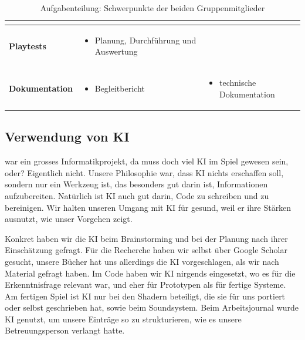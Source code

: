 \documentclass[../Main.tex]{subfiles}
\begin{document}
\begin{table}[H]
\begin{tabular}{|>{\raggedright\arraybackslash}p{2.6cm}|>{\raggedright\arraybackslash}p{5.8cm}|>{\raggedright\arraybackslash}p{5.8cm}|}
\begin{itemize}[nosep, leftmargin=*, label=--]
        \end{itemize}
        \\
        \hline
        \textbf{Playtests} &
        \begin{itemize}[nosep, leftmargin=*, label=--]
            \item Planung, Durchführung und Auswertung
        \end{itemize}
        & \\
        \hline
        \textbf{Dokumentation} &
        \begin{itemize}[nosep, leftmargin=*, label=--]
            \item Begleitbericht
        \end{itemize}
        &
        \begin{itemize}[nosep, leftmargin=*, label=--]
            \item technische Dokumentation
        \end{itemize}
        \\
        \hline
    \end{tabular}
    \caption{Aufgabenteilung: Schwerpunkte der beiden Gruppenmitglieder}
    \label{tab:Aufgabenteilung}
\end{table}

\subsection{Verwendung von KI} \label{sec:ReflexionKI}

 war ein grosses Informatikprojekt, da muss doch viel KI im Spiel gewesen sein, oder? Eigentlich nicht. Unsere Philosophie war, dass KI nichts erschaffen soll, sondern nur ein Werkzeug ist, das besonders gut darin ist, Informationen aufzubereiten. Natürlich ist KI auch gut darin, Code zu schreiben und zu bereinigen. Wir halten unseren Umgang mit KI für gesund, weil er ihre Stärken ausnutzt, wie unser Vorgehen zeigt.

Konkret haben wir die KI beim Brainstorming und bei der Planung nach ihrer Einschätzung gefragt. Für die Recherche haben wir selbst über Google Scholar gesucht, unsere Bücher hat uns allerdings die KI vorgeschlagen, als wir nach Material gefragt haben. Im Code haben wir KI nirgends eingesetzt, wo es für die Erkenntnisfrage relevant war, und eher für Prototypen als für fertige Systeme. Am fertigen Spiel ist KI nur bei den Shadern beteiligt, die sie für uns portiert oder selbst geschrieben hat, sowie beim Soundsystem. Beim Arbeitsjournal wurde KI genutzt, um unsere Einträge so zu strukturieren, wie es unsere Betreuungsperson verlangt hatte.
\end{document}
